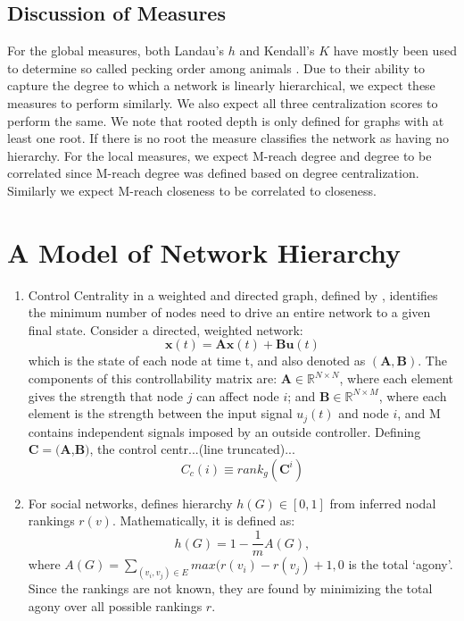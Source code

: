 \documentclass[3p,times]{elsarticle}
\begin{document}
\subsection{Discussion of Measures}
For the global measures, both Landau's $h$ and Kendall's $K$ have mostly been used to determine so called pecking order among animals \cite{animals}. Due to their ability to capture the degree to which a network is linearly hierarchical, we expect these measures to perform similarly. We also expect all three centralization scores to perform the same. We note that rooted depth is only defined for graphs with at least one root. If there is no root the measure classifies the network as having no hierarchy. For the local measures, we expect M-reach degree and degree to be correlated since M-reach degree was defined based on degree centralization. Similarly we expect M-reach closeness to be correlated to closeness.  

















\section{A Model of Network Hierarchy}

\begin{enumerate}
	\item Control Centrality in a weighted and directed graph, defined by \cite{Liu12}, identifies the minimum number of nodes need to drive an entire network to a given final state. Consider a directed, weighted network:
	$$
	\bm{x}(t) = \bm{Ax}(t) + \bm{Bu}(t)
	$$
	which is the state of each node at time t, and also denoted as \begin{math}(\bm{A},\bm{B})\end{math}. The components of this controllability matrix are: $\bm{A}\in \mathbb{R}^{N\times N}$, where each element gives the strength that node $j$ can affect node $i$; and $\bm{B}\in\mathbb{R}^{N\times M}$, where each element is the strength between the input signal $u_{j}(t)$ and node $i$, and M contains independent signals imposed by an outside controller. Defining $\bm{C} = (\bm{A}$,$\bm{B})$, the control centr...(line truncated)...
	$$
	C_{c}(i) \equiv rank_{g}(\bm{C}^{i})
	$$
	
	\item For social networks, \cite{online} defines hierarchy $h(G)\in[0,1]$ from inferred nodal rankings $r(v)$. Mathematically, it is defined as:
	$$
	h(G)=1-\frac{1}{m}A(G),
	$$ 
	where $A(G)=\sum_{(v_i,v_j)\in E} {max(r(v_i)-r(v_j)+1,0}$ is the total `agony'. Since the rankings are not known, they are found by minimizing the total agony over all possible rankings $r$.
	
	\end{enumerate}
	
\end{document}
